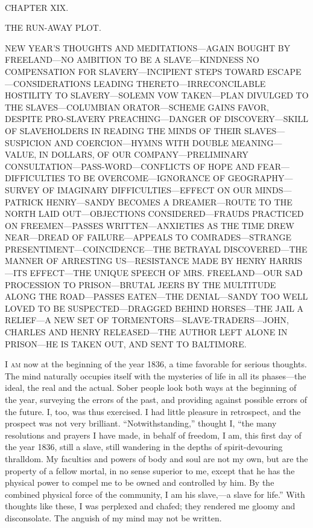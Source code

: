{\protect\hypertarget{271}{}{}}

~

{CHAPTER XIX.}

THE RUN-AWAY PLOT.

{NEW YEAR'S THOUGHTS AND MEDITATIONS---AGAIN BOUGHT BY FREELAND---NO
AMBITION TO BE A SLAVE---KINDNESS NO COMPENSATION FOR
SLAVERY---INCIPIENT STEPS TOWARD ESCAPE---CONSIDERATIONS LEADING
THERETO---IRRECONCILABLE HOSTILITY TO SLAVERY---SOLEMN VOW TAKEN---PLAN
DIVULGED TO THE SLAVES---COLUMBIAN ORATOR---SCHEME GAINS FAVOR, DESPITE
PRO-SLAVERY PREACHING---DANGER OF DISCOVERY---SKILL OF SLAVEHOLDERS IN
READING THE MINDS OF THEIR SLAVES---SUSPICION AND COERCION---HYMNS WITH
DOUBLE MEANING---VALUE, IN DOLLARS, OF OUR COMPANY---PRELIMINARY
CONSULTATION---PASS-WORD---CONFLICTS OF HOPE AND FEAR---DIFFICULTIES TO
BE OVERCOME---IGNORANCE OF GEOGRAPHY---SURVEY OF IMAGINARY
DIFFICULTIES---EFFECT ON OUR MINDS---PATRICK HENRY---SANDY BECOMES A
DREAMER---ROUTE TO THE NORTH LAID OUT---OBJECTIONS CONSIDERED---FRAUDS
PRACTICED ON FREEMEN---PASSES WRITTEN---ANXIETIES AS THE TIME DREW
NEAR---DREAD OF FAILURE---APPEALS TO COMRADES---STRANGE
PRESENTIMENT---COINCIDENCE---THE BETRAYAL DISCOVERED---THE MANNER OF
ARRESTING US---RESISTANCE MADE BY HENRY HARRIS---ITS EFFECT---THE UNIQUE
SPEECH OF MRS. FREELAND---OUR SAD PROCESSION TO PRISON---BRUTAL JEERS BY
THE MULTITUDE ALONG THE ROAD---PASSES EATEN---THE DENIAL---SANDY TOO
WELL LOVED TO BE SUSPECTED---DRAGGED BEHIND HORSES---THE JAIL A
RELIEF---A NEW SET OF TORMENTORS---SLAVE-TRADERS---JOHN, CHARLES AND
HENRY RELEASED---THE AUTHOR LEFT ALONE IN PRISON---HE IS TAKEN OUT, AND
SENT TO BALTIMORE.}

\textsc{I am} now at the beginning of the year 1836, a time favorable
for serious thoughts. The mind naturally occupies itself with the
mysteries of life in all its phases---the ideal, the real and the
actual. Sober people look both ways at the beginning of the year,
surveying the errors of the past, and providing against possible errors
of the future. I, too, was thus exercised. I had little pleasure in
retrospect, and the {\protect\hypertarget{272}{}{}}prospect was not very
brilliant. ``Notwithstanding,'' thought I, ``the many resolutions and
prayers I have made, in behalf of freedom, I am, this first day of the
year 1836, still a slave, still wandering in the depths of
spirit-devouring thralldom. My faculties and powers of body and soul are
not my own, but are the property of a fellow mortal, in no sense
superior to me, except that he has the physical power to compel me to be
owned and controlled by him. By the combined physical force of the
community, I am his slave,---a slave for life.'' With thoughts like
these, I was perplexed and chafed; they rendered me gloomy and
disconsolate. The anguish of my mind may not be written.

